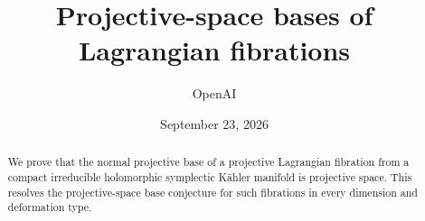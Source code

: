 \documentclass[11pt]{article}
\title{Projective-space bases of Lagrangian fibrations}
\author{OpenAI}
\date{September 23, 2026}
\theoremstyle{definition}
\theoremstyle{remark}
\numberwithin{equation}{section}
\begin{document}
\maketitle
\begin{abstract}
We prove that the normal projective base of a projective Lagrangian
fibration from a compact irreducible holomorphic symplectic Kähler manifold
is projective space. This resolves the projective-space base conjecture
for such fibrations in every dimension and deformation type.
\end{abstract}
\tableofcontents

\FloatBarrier













\end{document}
